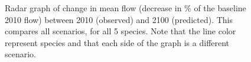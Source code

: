 \begin{figure}[h!]
  \caption[Radar graph of change in mean flow (decrease in \% of the baseline 2010 flow) between 2010 (observed) and 2100 (predicted), comparing all scenarios]{Radar graph of change in mean flow (decrease in \% of the baseline 2010 flow) between 2010 (observed) and 2100 (predicted). This compares all scenarios, for all 5 species. Note that the line color represent species and that each side of the graph is a different scenario.}
 \label{fig:flow_radar_both}
\end{figure}